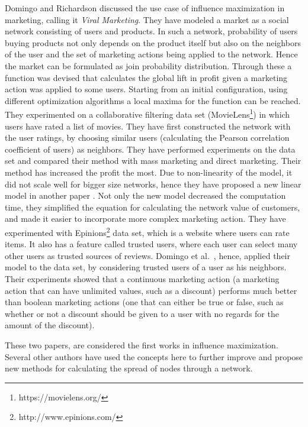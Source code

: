 \documentclass[english]{tktltiki}
\begin{document}
Domingo and Richardson \cite{domingo01} discussed the use case of influence maximization in marketing, calling it \textit{Viral Marketing}. 
They have modeled a market as a social network consisting of users and products. 
In such a network, probability of users buying products not only depends on the product itself but also on the neighbors of the user and the set of marketing actions being applied to the network. 
Hence the market can be formulated as join probability distribution. 
Through these a function was devised that calculates the global lift in profit given a marketing action was applied to some users. 
Starting from an initial configuration, using different optimization algorithms a local maxima for the function can be reached. 
They experimented on a collaborative filtering data set (MovieLens\footnote{https://movielens.org/}) in which users have rated a list of movies. They have first constructed the network with the user ratings, by choosing similar users (calculating the Pearson correlation coefficient of users) as neighbors. 
They have performed experiments on the data set and compared their method with mass marketing and direct marketing. 
Their method has increased the profit the most. 
Due to non-linearity of the model, it did not scale well for bigger size networks, hence they have proposed a new linear model in another paper \cite{domingo02}. 
Not only the new model decreased the computation time, they simplified the equation for calculating the network value of customers, and made it easier to incorporate more complex marketing action. 
They have experimented with Epinions\footnote{http://www.epinions.com/} data set, which is a website where users can rate items. 
It also has a feature called trusted users, where each user can select many other users as trusted sources of reviews. 
Domingo et al.\ \cite{domingo02}, hence, applied their model to the data set, by considering trusted users of a user as his neighbors. 
Their experiments showed that a continuous marketing action (a marketing action that can have unlimited values, such as a discount) performs much better than boolean marketing actions (one that can either be true or false, such as whether or not a discount should be given to a user with no regards for the amount of the discount). 

These two papers, are considered the first works in influence maximization. 
Several other authors have used the concepts here to further improve and propose new methods for calculating the spread of nodes through a network.
\end{document}
